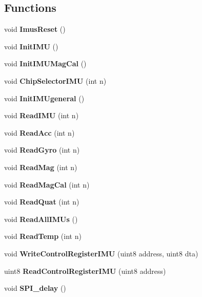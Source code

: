 \subsection*{Functions}
\begin{DoxyCompactItemize}
\item 
\mbox{\label{_i_m_u__functions_8c_a950a5a57e4188823c580d054ed2db16a}} 
void {\bfseries Imus\+Reset} ()
\item 
\mbox{\label{_i_m_u__functions_8c_ac4f81f61837e6a132dfceb5bb93b06fa}} 
void {\bfseries Init\+I\+MU} ()
\item 
\mbox{\label{_i_m_u__functions_8c_ac95975151b543b5265bc1e470aabf465}} 
void {\bfseries Init\+I\+M\+U\+Mag\+Cal} ()
\item 
\mbox{\label{_i_m_u__functions_8c_afae3632c7d21d6a41f6999eaabf7de07}} 
void {\bfseries Chip\+Selector\+I\+MU} (int n)
\item 
\mbox{\label{_i_m_u__functions_8c_a83f0630cb5ff556322c8cf56b6c6afc0}} 
void {\bfseries Init\+I\+M\+Ugeneral} ()
\item 
\mbox{\label{_i_m_u__functions_8c_a45df9ddb73de250cebfa02bf1d72bd97}} 
void {\bfseries Read\+I\+MU} (int n)
\item 
\mbox{\label{_i_m_u__functions_8c_a0290185f5b71ddb96ea13ce0a1ff48e7}} 
void {\bfseries Read\+Acc} (int n)
\item 
\mbox{\label{_i_m_u__functions_8c_ab8ae2a28912ce4a548b3603e86b22ae9}} 
void {\bfseries Read\+Gyro} (int n)
\item 
\mbox{\label{_i_m_u__functions_8c_a2ee29250f51422fa3d76df77335cce26}} 
void {\bfseries Read\+Mag} (int n)
\item 
\mbox{\label{_i_m_u__functions_8c_aad3b4856a76c623025484fe5b931bdd4}} 
void {\bfseries Read\+Mag\+Cal} (int n)
\item 
\mbox{\label{_i_m_u__functions_8c_a8eeecefb2efe7e01711fb9448c31ae76}} 
void {\bfseries Read\+Quat} (int n)
\item 
\mbox{\label{_i_m_u__functions_8c_a27bf3026dfe4cb0d6d255decc9944d71}} 
void {\bfseries Read\+All\+I\+M\+Us} ()
\item 
\mbox{\label{_i_m_u__functions_8c_ab0883cd12ebf2937fd6da478ac3ab976}} 
void {\bfseries Read\+Temp} (int n)
\item 
\mbox{\label{_i_m_u__functions_8c_aa907fcabe23515e5a6fb4187dd652ec3}} 
void {\bfseries Write\+Control\+Register\+I\+MU} (uint8 address, uint8 dta)
\item 
\mbox{\label{_i_m_u__functions_8c_ac1f1dc30233302bf8c1955c56ae837ae}} 
uint8 {\bfseries Read\+Control\+Register\+I\+MU} (uint8 address)
\item 
\mbox{\label{_i_m_u__functions_8c_a26f85d9c393e73879461861d2ac87379}} 
void {\bfseries S\+P\+I\+\_\+delay} ()
\end{DoxyCompactItemize}
